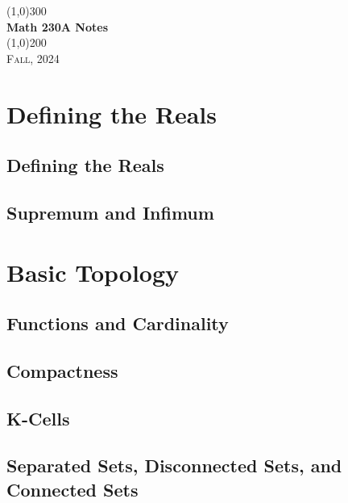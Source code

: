 \documentclass[a4paper, openany]{book}
\begin{document}
\begin{titlepage}
    \begin{center}
        \line(1,0){300} \\
        [0.25in]
        \huge{\bfseries Math 230A Notes} \\
        [2mm]
        \line(1,0){200} \\
        [1.5cm]
        \textsc{\LARGE Fall, 2024}
    \end{center}
\end{titlepage}

\tableofcontents
\setcounter{section}{0}

\chapter{Defining the Reals}
\section{Defining the Reals}

\newpage

\section{Supremum and Infimum}

\newpage

\chapter{Basic Topology}
\section{Functions and Cardinality}

\newpage

\section{Compactness}

\newpage

\section{K-Cells}

\newpage

\section{Separated Sets, Disconnected Sets, and Connected Sets}

\newpage
\end{document}

